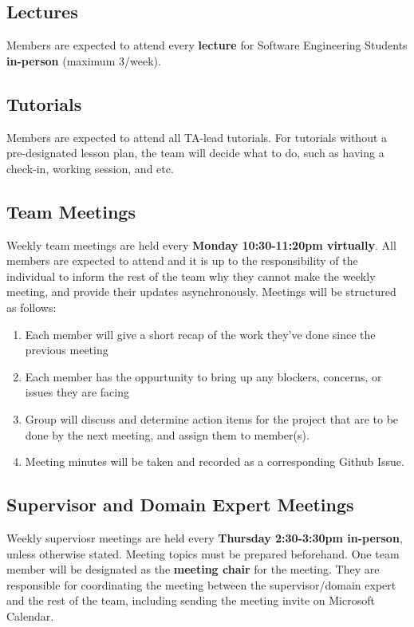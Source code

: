 \documentclass{article}
\begin{document}
\subsection{Lectures}
  Members are expected to attend every \textbf{lecture} for Software Engineering Students \textbf{in-person} (maximum 3/week).
\subsection{Tutorials}
  Members are expected to attend all TA-lead tutorials. For tutorials without a pre-designated lesson plan, the team will decide what to do, such as having a check-in, working session, and etc.
\subsection{Team Meetings}
  Weekly team meetings are held every \textbf{Monday 10:30-11:20pm virtually}.
  All members are expected to attend and it is up to the responsibility of the individual to inform the rest of the team why they cannot make the weekly meeting, and provide their updates asynchronously.
  Meetings will be structured as follows:
  \begin{enumerate}
    \item Each member will give a short recap of the work they've done since the previous meeting
    \item Each member has the oppurtunity to bring up any blockers, concerns, or issues they are facing
    \item Group will discuss and determine action items for the project that are to be done by the next meeting, and assign them to member(s).
    \item Meeting minutes will be taken and recorded as a corresponding Github Issue.
  \end{enumerate}
\subsection{Supervisor and Domain Expert Meetings}
  Weekly superviosr meetings are held every \textbf{Thursday 2:30-3:30pm in-person}, unless otherwise stated.
  Meeting topics must be prepared beforehand. One team member will be designated as the \textbf{meeting chair} for the meeting.
  They are responsible for coordinating the meeting between the supervisor/domain expert and the rest of the team, including sending the meeting invite on Microsoft Calendar.
\end{document}
